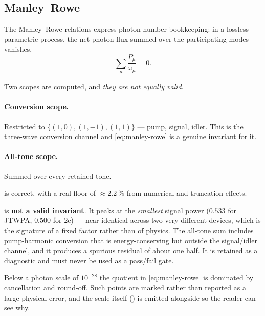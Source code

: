 \subsection{Manley--Rowe}
\label{sec:manley-rowe}

The Manley--Rowe relations express photon-number bookkeeping: in a lossless
parametric process, the net photon flux summed over the participating modes
vanishes,
\begin{equation}
  \sum_{\mu}\frac{P_\mu}{\omega_\mu} = 0 .
  \label{eq:manley-rowe}
\end{equation}

Two scopes are computed, and \emph{they are not equally valid}.

\paragraph{Conversion scope.} Restricted to $\{(1,0),(1,-1),(1,1)\}$ --- pump,
signal, idler. This is the three-wave conversion channel and
\eqref{eq:manley-rowe} is a genuine invariant for it.

\paragraph{All-tone scope.} Summed over every retained tone.

\begin{caveat}
 is correct, with a real floor of
$\approx\SI{2.2}{\percent}$ from numerical and truncation effects.

 is \textbf{not a valid invariant}. It
peaks at the \emph{smallest} signal power ($0.533$ for JTWPA, $0.500$ for 2c)
--- near-identical across two very different devices, which is the signature of
a fixed factor rather than of physics. The all-tone sum includes pump-harmonic
conversion that is energy-conserving but outside the signal/idler channel, and
it produces a spurious residual of about one half. It is retained as a
diagnostic and must never be used as a pass/fail gate.
\end{caveat}

\begin{implnote}
Below a photon scale of $10^{-28}$ the quotient in \eqref{eq:manley-rowe} is
dominated by cancellation and round-off. Such points are marked
 rather than reported as a large physical
error, and the scale itself () is emitted
alongside so the reader can see why.
\end{implnote}

